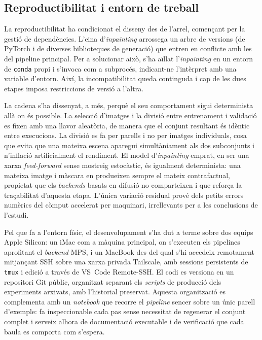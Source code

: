 \subsection{Reproductibilitat i entorn de treball}
La reproductibilitat ha condicionat el disseny des de l'arrel, començant per la gestió de dependències. L'eina d'\emph{inpainting} arrossega un arbre de versions (de PyTorch i de diverses biblioteques de generació) que entren en conflicte amb les del pipeline principal. Per a solucionar això, s'ha aïllat l'\emph{inpainting} en un entorn de \texttt{conda} propi i s'invoca com a subprocés, indicant-ne l'intèrpret amb una variable d'entorn. Així, la incompatibilitat queda continguda i cap de les dues etapes imposa restriccions de versió a l'altra.

La cadena s'ha dissenyat, a més, perquè el seu comportament sigui determinista allà on és possible. La selecció d'imatges i la divisió entre entrenament i validació es fixen amb una llavor aleatòria, de manera que el conjunt resultant és idèntic entre execucions. La divisió es fa per parells i no per imatges individuals, cosa que evita que una mateixa escena aparegui simultàniament als dos subconjunts i n'inflació artificialment el rendiment. El model d'\emph{inpainting} emprat, en ser una xarxa \emph{feed-forward} sense mostreig estocàstic, és igualment determinista: una mateixa imatge i màscara en produeixen sempre el mateix contrafactual, propietat que els \emph{backends} basats en difusió no comparteixen i que reforça la traçabilitat d'aquesta etapa. L'única variació residual prové dels petits errors numèrics del còmput accelerat per maquinari, irrellevants per a les conclusions de l'estudi.

Pel que fa a l'entorn físic, el desenvolupament s'ha dut a terme sobre dos equips Apple Silicon: un iMac com a màquina principal, on s'executen els pipelines aprofitant el \emph{backend} \ac{MPS}, i un MacBook des del qual s'hi accedeix remotament mitjançant SSH sobre una xarxa privada Tailscale, amb sessions persistents de \texttt{tmux} i edició a través de VS~Code Remote-SSH. El codi es versiona en un repositori Git públic, organitzat separant els \emph{scripts} de producció dels experiments arxivats, amb l'historial preservat. Aquesta organització es complementa amb un \emph{notebook} que recorre el \emph{pipeline} sencer sobre un únic parell d'exemple: fa inspeccionable cada pas sense necessitat de regenerar el conjunt complet i serveix alhora de documentació executable i de verificació que cada baula es comporta com s'espera.

